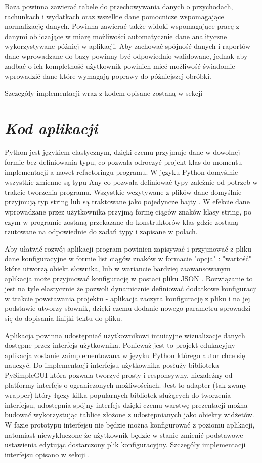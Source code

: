 \documentclass[a4paper,10pt, twoside]{report}
\newcommand{\customstylesection}[1]{\textbf{\textit{#1}}}
\begin{document}
{Baza powinna zawierać tabele do przechowywania danych o przychodach, rachunkach
 i wydatkach oraz wszelkie dane pomocnicze wspomagające normalizację danych. 
Powinna zawierać także widoki wspomagające pracę z danymi obliczające w miarę 
możliwości automatycznie dane analityczne wykorzystywane później w aplikacji. 
Aby zachować spójność danych i raportów dane wprowadzane do bazy powinny być 
odpowiednio walidowane, jednak aby zadbać o ich kompletność użytkownik powinien
mieć możliwość świadomie wprowadzić dane które wymagają poprawy do późniejszej 
obróbki.}

{Szczegóły implementacji wraz z kodem opisane zostaną w sekcji }

\section{\customstylesection{Kod aplikacji}}
{Python jest językiem elastycznym, dzięki czemu przyjmuje dane w dowolnej 
formie bez definiowania typu, co pozwala odroczyć projekt klas do momentu 
implementacji a nawet refactoringu programu. W języku Python \cite{Python} 
domyślnie wszystkie zmienne są typu Any co pozwala definiować typy zależnie od 
potrzeb w trakcie tworzenia programu. Wszystkie wczytywane z plików dane 
domyślnie przyjmują typ string lub są traktowane jako pojedyncze bajty 
\cite{Python_read-file}. W efekcie dane wprowadzane przez użytkownika przyjmą 
formę ciągów znaków klasy string, po czym w programie zostaną przekazane do 
konstruktorów klas gdzie zostaną rzutowane na odpowiednie do zadań typy i 
zapisane w polach.}

{Aby ułatwić rozwój aplikacji program powinien zapisywać i przyjmować z pliku 
dane konfiguracyjne w formie list ciągów znaków w formacie "opcja" : "wartość" 
które utworzą obiekt słownika, lub w wariancie bardziej zaawansowanym aplikacja 
może przyjmować konfigurację w postaci pliku JSON \cite{JSON}. Rozwiązanie to 
jest na tyle elastycznie że pozwoli dynamicznie definiować dodatkowe 
konfiguracji w trakcie powstawania projektu - aplikacja zaczyta konfigurację z 
pliku i na jej podstawie utworzy słownik, dzięki czemu dodanie nowego parametru 
sprowadzi się do dopisania linijki tektu do pliku.}

{Aplikacja powinna udostępniać użytkownikowi intuicyjne wizualizacje danych 
dostępne przez interfejs użytkownika. Ponieważ jest to projekt edukacyjny 
aplikacja zostanie zaimplementowana w języku Python \cite{Python} którego autor 
chce się nauczyć. Do implementacji interfejsu użytkownika posłuży biblioteka 
PySimpleGUI \cite{PySimpleGUI} która pozwala tworzyć prosty i responsywny, 
niezależny od platformy interfejs o ograniczonych możliwościach. Jest to adapter
 (tak zwany wrapper) który łączy kilka popularnych bibliotek służących do 
tworzenia interfejsu, udostępnia spójny interfejs dzięki czemu warstwę 
prezentacji można budować wykorzystując tablice złożone z udostępnianych jako 
obiekty widżetów. W fazie prototypu interfejsu nie będzie można konfigurować z 
poziomu aplikacji, natomiast niewykluczone że użytkownik będzie w stanie zmienić
 podstawowe ustawienia edytując dostarczony plik konfiguracyjny. Szczegóły 
implementacji interfejsu opisano w sekcji 
.}
\end{document}
